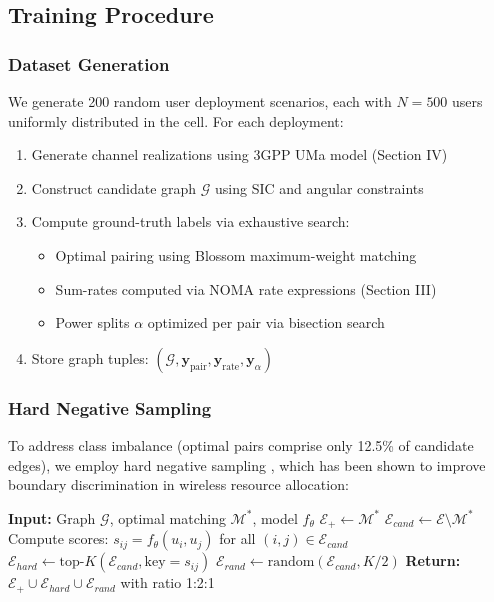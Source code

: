 \documentclass[conference]{IEEEtran}
\begin{document}
\subsection{Training Procedure}

\subsubsection{Dataset Generation}

We generate 200 random user deployment scenarios, each with $N = 500$ users uniformly distributed in the cell. For each deployment:

\begin{enumerate}
    \item Generate channel realizations using 3GPP UMa model (Section IV)
    \item Construct candidate graph $\mathcal{G}$ using SIC and angular constraints
    \item Compute ground-truth labels via exhaustive search:
    \begin{itemize}
        \item Optimal pairing using Blossom maximum-weight matching
        \item Sum-rates computed via NOMA rate expressions (Section III)
        \item Power splits $\alpha$ optimized per pair via bisection search
    \end{itemize}
    \item Store graph tuples: $(\mathcal{G}, \mathbf{y}_{\text{pair}}, \mathbf{y}_{\text{rate}}, \mathbf{y}_{\alpha})$
\end{enumerate}

\subsubsection{Hard Negative Sampling}

To address class imbalance (optimal pairs comprise only 12.5\% of candidate edges), we employ hard negative sampling \cite{sun2018learning}, which has been shown to improve boundary discrimination in wireless resource allocation:

\begin{algorithm}[!t]
\caption{Hard Negative Sampling Strategy}
\begin{algorithmic}[1]
\State \textbf{Input:} Graph $\mathcal{G}$, optimal matching $\mathcal{M}^*$, model $f_\theta$
\State $\mathcal{E}_+ \gets \mathcal{M}^*$ 
\State $\mathcal{E}_{cand} \gets \mathcal{E} \setminus \mathcal{M}^*$ 
\State Compute scores: $s_{ij} = f_\theta(u_i, u_j)$ for all $(i,j) \in \mathcal{E}_{cand}$
\State $\mathcal{E}_{hard} \gets \text{top-}K(\mathcal{E}_{cand}, \text{key}=s_{ij})$ 
\State $\mathcal{E}_{rand} \gets \text{random}(\mathcal{E}_{cand}, K/2)$ 
\State \textbf{Return:} $\mathcal{E}_+ \cup \mathcal{E}_{hard} \cup \mathcal{E}_{rand}$ with ratio 1:2:1
\end{algorithmic}
\end{algorithm}
\end{document}
